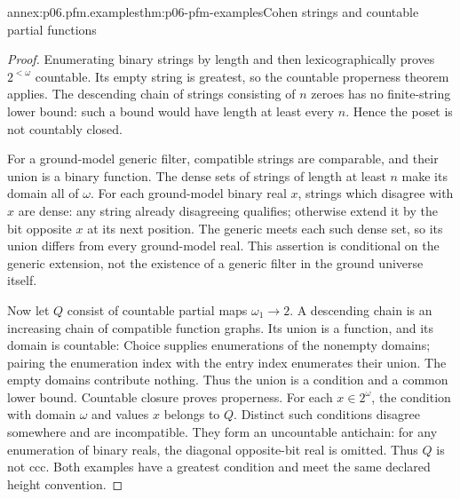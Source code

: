 \begin{annexitem}{annex:p06.pfm.examples}{thm:p06-pfm-examples}{Cohen strings and countable partial functions}
\begin{proof}
Enumerating binary strings by length and then lexicographically proves
\(2^{<\omega}\) countable. Its empty string is greatest, so the countable
properness theorem applies. The descending chain of strings consisting
of \(n\) zeroes has no finite-string lower bound: such a bound would
have length at least every \(n\). Hence the poset is not countably closed.

For a ground-model generic filter, compatible strings are comparable,
and their union is a binary function. The dense sets of strings of length
at least \(n\) make its domain all of \(\omega\).
For each ground-model binary real \(x\), strings which disagree with \(x\)
are dense: any string already disagreeing qualifies; otherwise extend it
by the bit opposite \(x\) at its next position.
The generic meets each such dense set, so its union differs from every
ground-model real. This assertion is conditional on the generic extension,
not the existence of a generic filter in the ground universe itself.

Now let \(Q\) consist of countable partial maps \(\omega_1\to2\).
A descending chain is an increasing chain of compatible function graphs.
Its union is a function, and its domain is countable: Choice supplies
enumerations of the nonempty domains; pairing the enumeration index with
the entry index enumerates their union. The empty domains contribute nothing.
Thus the union is a condition and a common lower bound.
Countable closure proves properness.
For each \(x\in2^\omega\), the condition with domain \(\omega\) and values
\(x\) belongs to \(Q\). Distinct such conditions disagree somewhere and
are incompatible. They form an uncountable antichain: for any enumeration
of binary reals, the diagonal opposite-bit real is omitted.
Thus \(Q\) is not ccc. Both examples have a greatest condition and meet
the same declared height convention.
\end{proof}
\end{annexitem}

